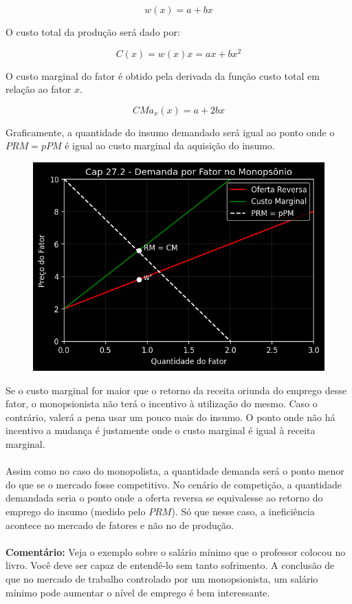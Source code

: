 \documentclass[a4paper,11pt,oneside]{book}
\theoremstyle{definition}
\theoremstyle{break}
\begin{document}
$$ w(x) = a + bx $$

O custo total da produção será dado por:

$$ C(x) = w(x)x = ax + bx^2 $$

O custo marginal do fator é obtido pela derivada da função custo total em relação ao fator $x$.

$$ CMa_x(x) = a + 2bx $$

Graficamente, a quantidade do insumo demandado será igual ao ponto onde o $PRM = pPM$ é igual ao custo marginal da aquisição do insumo.

\begin{figure}[H]
\centering
\includegraphics[scale=0.75]{cap27_2-demanda_fatores_monopsonio.png}
\end{figure}

Se o custo marginal for maior que o retorno da receita oriunda do emprego desse fator, o monopsionista não terá o incentivo à utilização do mesmo. Caso o contrário, valerá a pena usar um pouco mais do insumo. O ponto onde não há incentivo a mudança é justamente onde o custo marginal é igual à receita marginal.
\\~\\
Assim como no caso do monopolista, a quantidade demanda será o ponto menor do que se o mercado fosse competitivo. No cenário de competição, a quantidade demandada seria o ponto onde a oferta reversa se equivalesse ao retorno do emprego do insumo (medido pelo $PRM$). Só que nesse caso, a ineficiência acontece no mercado de fatores e não no de produção.
\\~\\
\textbf{Comentário:} Veja o exemplo sobre o salário mínimo que o professor colocou no livro. Você deve ser capaz de entendê-lo sem tanto sofrimento. A conclusão de que no mercado de trabalho controlado por um monopsionista, um salário mínimo pode aumentar o nível de emprego é bem interessante.
\end{document}

